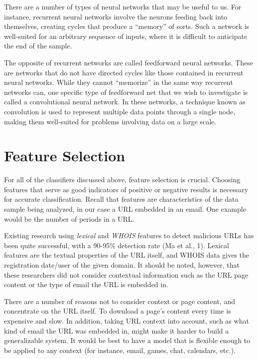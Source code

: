 \documentclass[cs,proposal]{hmcclinic}
\begin{document}
There are a number of types of neural networks that may be useful to us. For instance, recurrent neural networks involve the neurons feeding back into themselves, creating cycles that produce a ``memory'' of sorts. Such a network is well-suited for an arbitrary sequence of inputs, where it is difficult to anticipate the end of the sample.

The opposite of recurrent networks are called feedforward neural networks. These are networks that do not have directed cycles like those contained in recurrent neural networks. While they cannot ``memorize'' in the same way recurrent networks can, one specific type of feedforward net that we wish to investigate is called a convolutional neural network. In these networks, a technique known as convolution is used to represent multiple data points through a single node, making them well-suited for problems involving data on a large scale.


\section{Feature Selection} \label{feature-selection}

For all of the classifiers discussed above, feature selection is crucial. Choosing features that serve as good indicators of positive or negative results is necessary for accurate classification. Recall that features are characteristics of the data sample being analyzed, in our case a URL embedded in an email. One example would be the number of periods in a URL.

Existing research using \textit{lexical} and \textit{WHOIS} features to detect malicious URLs has been quite successful, with a 90-95\% detection rate (Ma et al., 1). Lexical features are the textual properties of the URL itself, and WHOIS data gives the registration date/user of the given domain. It should be noted, however, that these researchers did not consider contextual information such as the URL page content or the type of email the URL is embedded in.

There are a number of reasons not to consider context or page content, and concentrate on the URL itself. To download a page's content every time is expensive and slow. In addition, taking URL context into account, such as what kind of email the URL was embedded in, might make it harder to build a generalizable system. It would be best to have a model that is flexible enough to be applied to any context (for instance, email, games, chat, calendars, etc.). 
\end{document}
